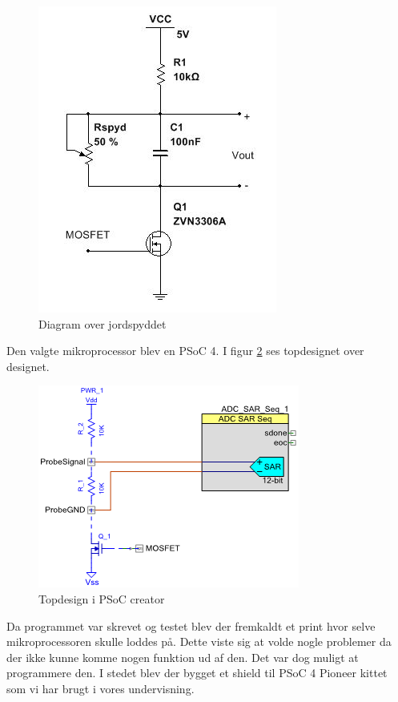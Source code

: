 \begin{figure}[H]
	\centering 
	\includegraphics[scale=0.8]{../Projektdokumentation/HardwareArkitektur/Sensore/Jordfugt_billeder/jordspyd.JPG}
	\caption{Diagram over jordspyddet}
	\label{photo:jordspyd_diagram}
\end{figure} 

Den valgte mikroprocessor blev en PSoC 4. I figur \ref{photo:PSoC_Creator} ses topdesignet over designet. 

\begin{figure}[H]
	\centering 
	\includegraphics[scale=0.8]{../Projektdokumentation/HardwareArkitektur/Sensore/Jordfugt_billeder/SAR_converter.png}
	\caption{Topdesign i PSoC creator}
	\label{photo:PSoC_Creator}
\end{figure} 

Da programmet var skrevet og testet blev der fremkaldt et print hvor selve mikroprocessoren skulle loddes på. Dette viste sig at volde nogle problemer da der ikke kunne komme nogen funktion ud af den. Det var dog muligt at programmere den. I stedet blev der bygget et shield til PSoC 4 Pioneer kittet som vi har brugt i vores undervisning. 

